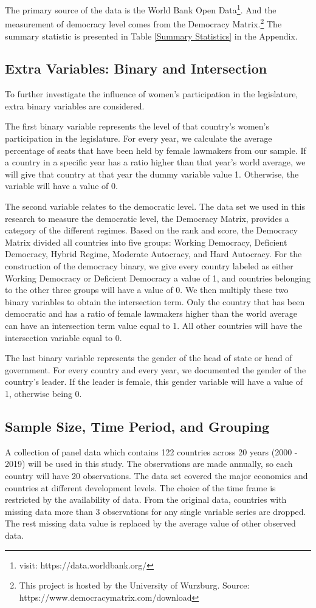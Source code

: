 The primary source of the data is the World Bank Open Data\footnote{visit: https://data.worldbank.org/}.
And the measurement of democracy level comes from the Democracy Matrix.\footnote{This project is hosted by the University of Wurzburg. Source: https://www.democracymatrix.com/download}
The summary statistic is presented in Table \ref{Summary Statistics} in the Appendix.

\subsection{Extra Variables: Binary and Intersection}
\label{Binary Variable}
To further investigate the influence of women's participation in the legislature, extra binary variables are considered.

The first binary variable represents the level of that country's women's participation in the legislature.
For every year, we calculate the average percentage of seats that have been held by female lawmakers from our sample.
If a country in a specific year has a ratio higher than that year's world average, we will give that country at that year the dummy variable value 1.
Otherwise, the variable will have a value of 0.

The second variable relates to the democratic level.
The data set we used in this research to measure the democratic level, the Democracy Matrix, provides a category of the different regimes.
Based on the rank and score, the Democracy Matrix divided all countries into five groups: Working Democracy, Deficient Democracy, Hybrid Regime, Moderate Autocracy, and Hard Autocracy.
For the construction of the democracy binary, we give every country labeled as either Working Democracy or Deficient Democracy a value of 1, and countries belonging to the other three groups will have a value of 0.
We then multiply these two binary variables to obtain the intersection term.
Only the country that has been democratic and has a ratio of female lawmakers higher than the world average can have an intersection term value equal to 1.
All other countries will have the intersection variable equal to 0.

The last binary variable represents the gender of the head of state or head of government. 
For every country and every year, we documented the gender of the country's leader.
If the leader is female, this gender variable will have a value of 1, otherwise being 0.

\subsection{Sample Size, Time Period, and Grouping}
A collection of panel data which contains 122 countries across 20 years (2000 - 2019) will be used in this study.
The observations are made annually, so each country will have 20 observations.
The data set covered the major economies and countries at different development levels.
The choice of the time frame is restricted by the availability of data.
From the original data, countries with missing data more than 3 observations for any single variable series are dropped.
The rest missing data value is replaced by the average value of other observed data. 

